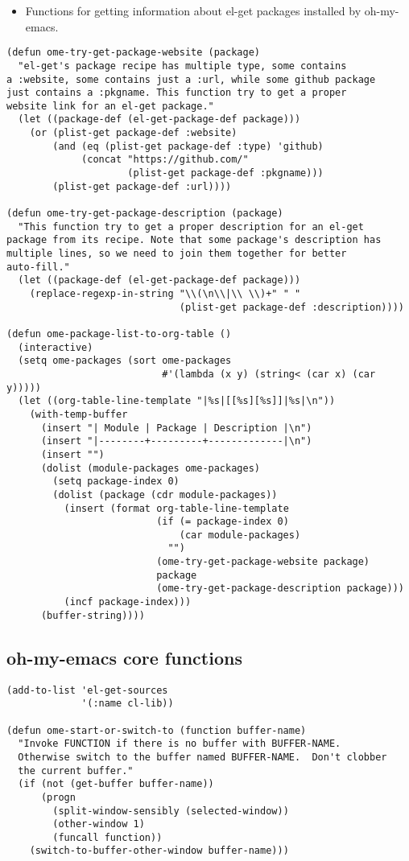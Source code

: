 \documentclass[11pt]{article}
\begin{document}
\begin{itemize}
\item Functions for getting information about el-get packages installed by
oh-my-emacs.
\end{itemize}
\begin{verbatim}
(defun ome-try-get-package-website (package)
  "el-get's package recipe has multiple type, some contains
a :website, some contains just a :url, while some github package
just contains a :pkgname. This function try to get a proper
website link for an el-get package."
  (let ((package-def (el-get-package-def package)))
    (or (plist-get package-def :website)
        (and (eq (plist-get package-def :type) 'github)
             (concat "https://github.com/"
                     (plist-get package-def :pkgname)))
        (plist-get package-def :url))))

(defun ome-try-get-package-description (package)
  "This function try to get a proper description for an el-get
package from its recipe. Note that some package's description has
multiple lines, so we need to join them together for better
auto-fill."
  (let ((package-def (el-get-package-def package)))
    (replace-regexp-in-string "\\(\n\\|\\ \\)+" " "
                              (plist-get package-def :description))))

(defun ome-package-list-to-org-table ()
  (interactive)
  (setq ome-packages (sort ome-packages
                           #'(lambda (x y) (string< (car x) (car y)))))
  (let ((org-table-line-template "|%s|[[%s][%s]]|%s|\n"))
    (with-temp-buffer
      (insert "| Module | Package | Description |\n")
      (insert "|--------+---------+-------------|\n")
      (insert "")
      (dolist (module-packages ome-packages)
        (setq package-index 0)
        (dolist (package (cdr module-packages))
          (insert (format org-table-line-template
                          (if (= package-index 0)
                              (car module-packages)
                            "")
                          (ome-try-get-package-website package)
                          package
                          (ome-try-get-package-description package)))
          (incf package-index)))
      (buffer-string))))
\end{verbatim}

\subsection*{oh-my-emacs core functions}
\label{sec-3-2}
\begin{verbatim}
(add-to-list 'el-get-sources
             '(:name cl-lib))

(defun ome-start-or-switch-to (function buffer-name)
  "Invoke FUNCTION if there is no buffer with BUFFER-NAME.
  Otherwise switch to the buffer named BUFFER-NAME.  Don't clobber
  the current buffer."
  (if (not (get-buffer buffer-name))
      (progn
        (split-window-sensibly (selected-window))
        (other-window 1)
        (funcall function))
    (switch-to-buffer-other-window buffer-name)))
\end{verbatim}
\end{document}
